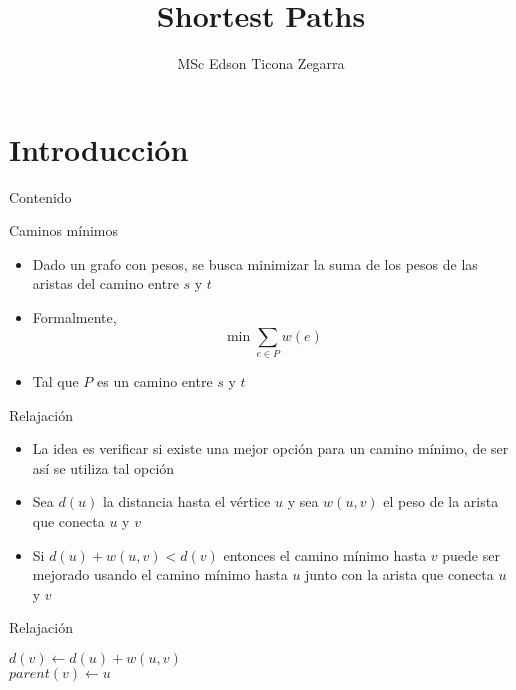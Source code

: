 \documentclass[]{beamer}
\title{Shortest Paths}
\author{MSc Edson Ticona Zegarra}
\institute{Taller avanzado 2025}
\date{}
\begin{document}
\maketitle

\section{Introducci\'on}
\begin{frame}{Contenido}
\tableofcontents
\end{frame}

\begin{frame}{Caminos m\'inimos}
  \begin{itemize}
    \item Dado un grafo con pesos, se busca minimizar la suma de los pesos de las aristas del camino entre $s$ y $t$
      \pause
    \item Formalmente, $$ \min \sum_{e \in P} w(e)$$
      \pause
    \item Tal que $P$ es un camino entre $s$ y $t$
  \end{itemize}
\end{frame}

\begin{frame}{Relajaci\'on}
  \begin{itemize}
    \item La idea es verificar si existe una mejor opci\'on para un camino m\'inimo, de ser as\'i se utiliza tal opci\'on
      \pause
    \item Sea $d(u)$ la distancia hasta el v\'ertice $u$ y sea $w(u,v)$ el peso de la arista que conecta $u$ y $v$
      \pause
    \item Si $d(u) + w(u,v) < d(v)$ entonces el camino m\'inimo hasta $v$ puede ser mejorado usando el camino m\'inimo hasta $u$ junto con la arista que conecta $u$ y $v$
  \end{itemize}
\end{frame}

\begin{frame}{Relajaci\'on}
  \begin{algorithm}[H]
    {
      {$d(v) \gets d(u) + w(u,v)$} \\
      {$parent(v) \gets u$} \\
    }
  \end{algorithm}
\end{frame}
\end{document}
